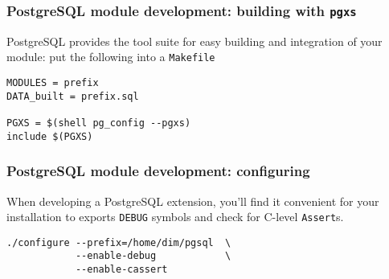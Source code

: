 \documentclass{beamer}
\begin{document}

\begin{frame}[fragile]
  \frametitle{PostgreSQL module development: building with \texttt{pgxs}}

  PostgreSQL provides the tool suite for easy building and integration of
  your module: put the following into a \texttt{Makefile}

  \begin{example}
  \begin{verbatim}
MODULES = prefix
DATA_built = prefix.sql

PGXS = $(shell pg_config --pgxs)
include $(PGXS)
  \end{verbatim}
  \end{example}
\end{frame}

\begin{frame}[fragile]
  \frametitle{PostgreSQL module development: configuring}

  When developing a PostgreSQL extension, you'll find it convenient for
  your installation to exports \texttt{DEBUG} symbols and check for C-level
  \texttt{Assert}s.

  \begin{example}
  \begin{verbatim}
./configure --prefix=/home/dim/pgsql  \
            --enable-debug            \
            --enable-cassert
  \end{verbatim}
  \end{example}
\end{frame}
\end{document}
